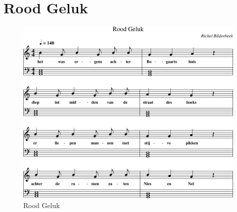 \section{Rood Geluk}



\begin{figure}[!htbp]
  \includegraphics[width=\textwidth,height=\textheight,keepaspectratio]{../songs/11_rood_geluk.png}
  \caption{Rood Geluk}
  \label{fig:11_rood_geluk}
\end{figure}
